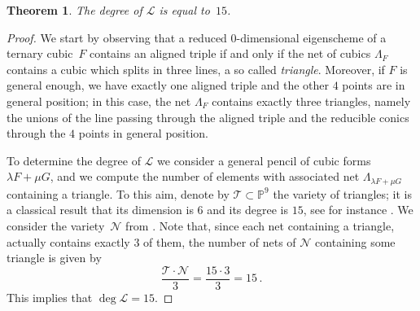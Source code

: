 \documentclass[11pt, a4paper, reqno, captions=tableheading,bibliography=totoc]{scrartcl}
\theoremstyle{plain}
\newtheorem{theorem}[lemma]{Theorem}
\theoremstyle{definition}
\newcommand{\p}{\mathbb{P}}
\begin{document}
\begin{theorem}
The degree of $\mathcal{L}$ is equal to~$15$.
\end{theorem}
\begin{proof}
We start by observing that a reduced $0$-dimensional eigenscheme of a ternary cubic~$F$ contains an aligned triple if and only if the net of cubics $\Lambda_F$ contains a cubic which splits in three lines, a so called \emph{triangle}. Moreover, if $F$ is general enough, we have exactly one aligned triple and the other $4$ points are in general position; in this case, the net $\Lambda_F$ contains exactly three triangles, namely the unions of the line passing through the aligned triple and the reducible conics through the $4$ points in general position.

To determine the degree of $\mathcal{L}$ we consider a general pencil of cubic forms $\lambda F + \mu G$, and we compute the number of elements with associated net $\Lambda_{\lambda F + \mu G}$ containing a triangle. To this aim, denote by $\mathcal{T} \subset \p^9$ the variety of triangles; it is a classical result that its dimension is $6$ and its degree is $15$, see for instance \cite[Section 2.2.2]{3264}. We consider the variety~$\mathcal{N}$ from .
Note that, since each net containing a triangle, actually contains exactly $3$ of them, the number of nets of $\mathcal{N}$ containing some triangle is given by
%
\[
\frac{\mathcal{T} \cdot {\mathcal N}}{3} = \frac{{15} \cdot {3}}{3} = 15 \,.
\]
%
This implies that $\deg \mathcal{L} = 15$.
\end{proof}




\end{document}
